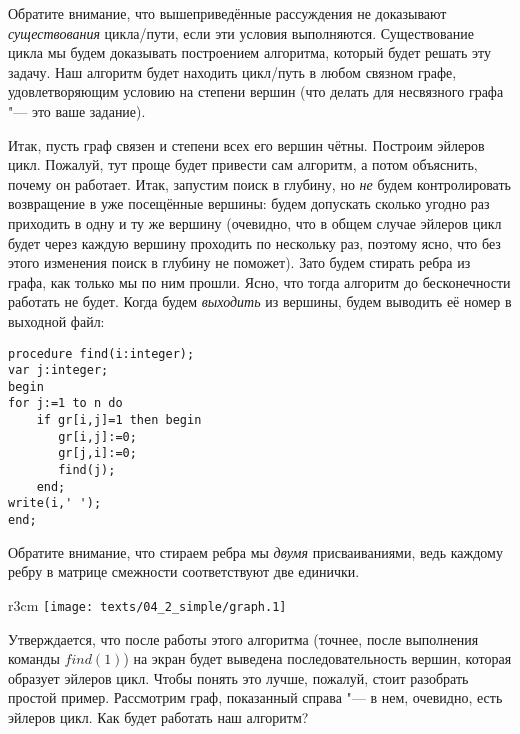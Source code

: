 
Обратите внимание, что вышеприведённые рассуждения не доказывают \textit{существования} цикла/пути, 
если эти условия выполняются. Существование цикла мы будем доказывать построением алгоритма, 
который будет решать эту задачу. Наш алгоритм будет находить цикл/путь в любом связном графе, 
удовлетворяющим условию на степени вершин (что делать для несвязного графа "--- это ваше задание).

Итак, пусть граф связен и степени всех его вершин чётны. Построим эйлеров цикл. Пожалуй, тут проще 
будет привести сам алгоритм, а потом объяснить, почему он работает. Итак, запустим поиск в глубину, 
но \textit{не} будем контролировать возвращение в уже посещённые вершины: будем допускать сколько 
угодно раз приходить в одну и ту же вершину (очевидно, что в общем случае эйлеров цикл будет через 
каждую вершину проходить по нескольку раз, поэтому ясно, что без этого изменения поиск в глубину не 
поможет). Зато будем стирать ребра из графа, как только мы по ним прошли. Ясно, что тогда алгоритм 
до бесконечности работать не будет. Когда будем \textit{выходить} из вершины, будем выводить её 
номер в выходной файл:
\begin{codesampleo}\begin{verbatim}
procedure find(i:integer);
var j:integer;
begin
for j:=1 to n do
    if gr[i,j]=1 then begin
       gr[i,j]:=0;
       gr[j,i]:=0;
       find(j);
    end;
write(i,' ');
end;
\end{verbatim}
\end{codesampleo}
Обратите внимание, что стираем ребра мы \textit{двумя} присваиваниями, ведь каждому ребру в матрице 
смежности соответствуют две единички.

\begin{wrapfigure}{r}{3cm}
\vspace{-0.3cm}
\texttt{[image: texts/04\_2\_simple/graph.1]}
\end{wrapfigure}
Утверждается, что после работы этого алгоритма (точнее, после выполнения команды $find(1)$)
на экран будет выведена последовательность вершин, 
которая образует эйлеров цикл. Чтобы понять это лучше, пожалуй, стоит разобрать простой пример.
Рассмотрим граф, показанный справа "--- в нем, очевидно, есть эйлеров цикл. Как будет работать наш 
алгоритм?


